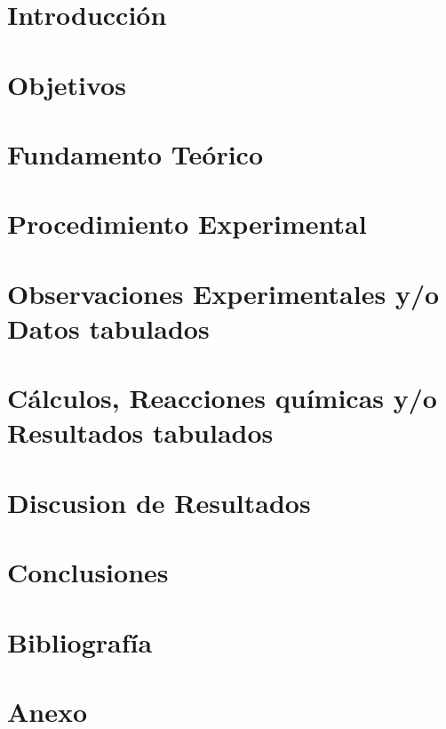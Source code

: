 \documentclass[12pt, a4paper]{article}
\begin{document}


\pagestyle{fancy}
\fancyfoot{} %
\fancyfoot[R]{\thepage}

\tableofcontents
\clearpage

\section{Introducción}


\section{Objetivos}


\section{Fundamento Teórico}


\section{Procedimiento Experimental}


\section{Observaciones Experimentales y/o Datos tabulados}


\section{Cálculos, Reacciones químicas y/o Resultados tabulados}


\section{Discusion de Resultados}


\section{Conclusiones}


\section{Bibliografía}
\printbibliography

\clearpage

\listoffigures
\listoftables

\clearpage

\section{Anexo}
\end{document}
